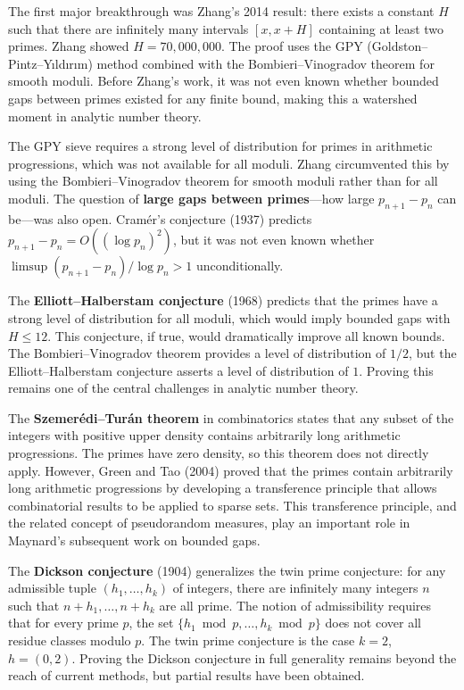 The first major breakthrough was Zhang's 2014 result: there exists a constant $H$ such that there are infinitely many intervals $[x, x+H]$ containing at least two primes. Zhang showed $H = 70,000,000$. The proof uses the GPY (Goldston--Pintz--Y{\i}ld{\i}r{\i}m) method combined with the Bombieri--Vinogradov theorem for smooth moduli. Before Zhang's work, it was not even known whether bounded gaps between primes existed for any finite bound, making this a watershed moment in analytic number theory.

The GPY sieve requires a strong level of distribution for primes in arithmetic progressions, which was not available for all moduli. Zhang circumvented this by using the Bombieri--Vinogradov theorem for smooth moduli rather than for all moduli. The question of \textbf{large gaps between primes}---how large $p_{n+1} - p_n$ can be---was also open. Cram\'er's conjecture (1937) predicts $p_{n+1} - p_n = O((\log p_n)^2)$, but it was not even known whether $\limsup (p_{n+1} - p_n) / \log p_n > 1$ unconditionally.

The \textbf{Elliott--Halberstam conjecture} (1968) predicts that the primes have a strong level of distribution for all moduli, which would imply bounded gaps with $H \le 12$. This conjecture, if true, would dramatically improve all known bounds. The Bombieri--Vinogradov theorem provides a level of distribution of $1/2$, but the Elliott--Halberstam conjecture asserts a level of distribution of $1$. Proving this remains one of the central challenges in analytic number theory.

The \textbf{Szemer\'edi--Tur\'an theorem} in combinatorics states that any subset of the integers with positive upper density contains arbitrarily long arithmetic progressions. The primes have zero density, so this theorem does not directly apply. However, Green and Tao (2004) proved that the primes contain arbitrarily long arithmetic progressions by developing a transference principle that allows combinatorial results to be applied to sparse sets. This transference principle, and the related concept of pseudorandom measures, play an important role in Maynard's subsequent work on bounded gaps.

The \textbf{Dickson conjecture} (1904) generalizes the twin prime conjecture: for any admissible tuple $(h_1, \ldots, h_k)$ of integers, there are infinitely many integers $n$ such that $n + h_1, \ldots, n + h_k$ are all prime. The notion of admissibility requires that for every prime $p$, the set $\{h_1 \bmod p, \ldots, h_k \bmod p\}$ does not cover all residue classes modulo $p$. The twin prime conjecture is the case $k = 2$, $h = (0, 2)$. Proving the Dickson conjecture in full generality remains beyond the reach of current methods, but partial results have been obtained.

